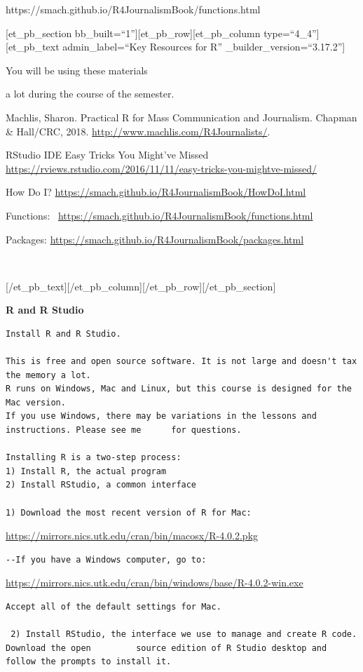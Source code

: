 \documentclass[]{book}
\begin{document}
https://smach.github.io/R4JournalismBook/functions.html

{[}et\_pb\_section bb\_built=``1''{]}{[}et\_pb\_row{]}{[}et\_pb\_column type=``4\_4''{]}{[}et\_pb\_text admin\_label=``Key Resources for R'' \_builder\_version=``3.17.2''{]}

You will be using these materials

a lot during the course of the semester.

Machlis, Sharon. Practical R for Mass Communication and Journalism. Chapman \& Hall/CRC, 2018. \url{http://www.machlis.com/R4Journalists/}.

RStudio IDE Easy Tricks You Might've Missed
\url{https://rviews.rstudio.com/2016/11/11/easy-tricks-you-mightve-missed/}

How Do I?
\url{https://smach.github.io/R4JournalismBook/HowDoI.html}

Functions:~
\url{https://smach.github.io/R4JournalismBook/functions.html}

Packages:
\url{https://smach.github.io/R4JournalismBook/packages.html}

~

{[}/et\_pb\_text{]}{[}/et\_pb\_column{]}{[}/et\_pb\_row{]}{[}/et\_pb\_section{]}

\textbf{R and R Studio}

\begin{verbatim}
Install R and R Studio.

This is free and open source software. It is not large and doesn't tax the memory a lot. 
R runs on Windows, Mac and Linux, but this course is designed for the Mac version. 
If you use Windows, there may be variations in the lessons and instructions. Please see me      for questions.

Installing R is a two-step process: 
1) Install R, the actual program
2) Install RStudio, a common interface 

1) Download the most recent version of R for Mac:         
\end{verbatim}

\url{https://mirrors.nics.utk.edu/cran/bin/macosx/R-4.0.2.pkg}

\begin{verbatim}
--If you have a Windows computer, go to: 
\end{verbatim}

\url{https://mirrors.nics.utk.edu/cran/bin/windows/base/R-4.0.2-win.exe}

\begin{verbatim}
Accept all of the default settings for Mac.

 2) Install RStudio, the interface we use to manage and create R code. Download the open         source edition of R Studio desktop and follow the prompts to install it.   
\end{verbatim}
\end{document}
